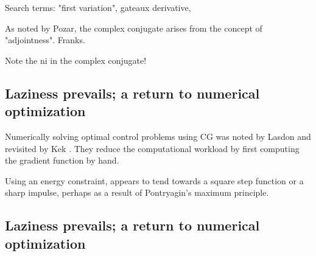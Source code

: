 \documentclass[paper.tex]{subfiles}
\begin{document}
Search terms: "first variation", gateaux derivative, 

As noted by Pozar, the complex conjugate arises from the concept of "adjointness". Franks.

Note the ni in the complex conjugate!


\subsection{Laziness prevails; a return to numerical optimization}

Numerically solving optimal control problems using CG was noted by Lasdon \cite{conjugate1967} and 
revisited by Kek \cite{Conjugate}. They reduce the computational workload by first computing the 
gradient function by hand.

Using an energy constraint, appears to tend towards a square step function or a sharp impulse, perhaps as a result of Pontryagin's maximum principle\cite{Optimum1964}.




\subsection{Laziness prevails; a return to numerical optimization}
\end{document}
